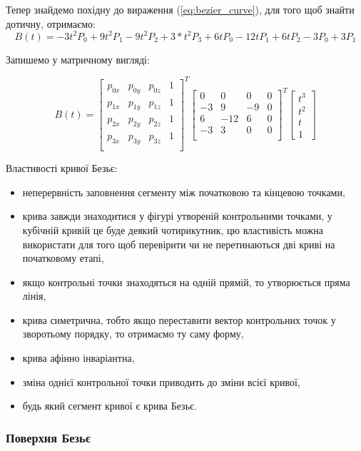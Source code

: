 \documentclass[14pt,a4paper]{extarticle}
\theoremstyle{definition}
\renewcommand{\[}{\begin{singlespace}\begin{equation*}}
\renewcommand{\]}{\end{equation*}\end{singlespace}}
\begin{document}
Тепер знайдемо похідну до вираження (\ref{eq:bezier_curve}), для того щоб знайти дотичну, отримаємо:
\begin{equation}
B(t) = -3t^2P_0+9t^2P_1-9t^2P_2+3*t^2P_3 + 6tP_0-12tP_1+6tP_2 - 3P_0+3P_1
\end{equation}

Запишемо у матричному вигляді:
\[B(t)=\left[\begin{matrix}
p_{0x} & p_{0y} & p_{0z} & 1 \\
p_{1x} & p_{1y} & p_{1z} & 1 \\
p_{2x} & p_{2y} & p_{2z} & 1 \\
p_{3x} & p_{3y} & p_{3z} & 1 \\
\end{matrix}\right]^T\left[\begin{matrix}
 0 &   0 &  0 & 0 \\
-3 &   9 & -9 & 0 \\
 6 & -12 &  6 & 0 \\
-3 &   3 &  0 & 0 \\
\end{matrix}\right]^T\left[\begin{matrix}t^3\\t^2\\t\\1\end{matrix}\right]\]

Властивості кривої Безьє:
\begin{itemize}
\item неперервність заповнення сегменту між початковою та кінцевою точками,
\item крива завжди знаходитися у фігурі утвореній контрольними точками, у кубічній кривій це буде деякий чотирикутник, цю властивість можна використати для того щоб перевірити чи не перетинаються дві криві на початковому етапі,
\item якщо контрольні точки знаходяться на одній прямій, то утворюється пряма лінія,
\item крива симетрична, тобто якщо переставити вектор контрольних точок у зворотьому порядку, то отримаємо ту саму форму,
\item крива афінно інваріантна,
\item зміна однієї контрольної точки приводить до зміни всієї кривої,
\item будь який сегмент кривої є крива Безьє.
\end{itemize}

\subsubsection{Поверхня Безьє}
\end{document}
